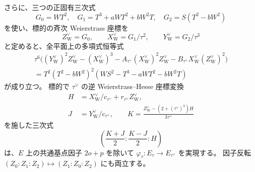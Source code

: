 \begin{proposition}
さらに、三つの正固有三次式
\begin{equation}\label{ifj:eq:cubic-sextet-isogeny-triple}
 G_0=WT^2,\quad
 G_1=T^3+aWT^2+bW^2T,\quad
 G_2=S(T^2-bW^2)
\end{equation}
を使い、標的の斉次 Weierstrass 座標を
\[
 Z^\vee_{\mathrm W}=G_0,\qquad
 X^\vee_{\mathrm W}=G_1/\tau^2,\qquad
 Y^\vee_{\mathrm W}=G_2/\tau^3
\]
と定めると、全平面上の多項式恒等式
\begin{equation}\label{ifj:eq:cubic-sextet-nine-identity}
 \begin{split}
 \tau^6\bigl(
 (Y^\vee_{\mathrm W})^2Z^\vee_{\mathrm W}
 -(X^\vee_{\mathrm W})^3
 -A_{\tau^\vee}(X^\vee_{\mathrm W})^2Z^\vee_{\mathrm W}
 -B_{\tau^\vee}X^\vee_{\mathrm W}(Z^\vee_{\mathrm W})^2
 \bigr)\\
 =T^2(T^2-bW^2)^2
       (WS^2-T^3-aWT^2-bW^2T)
 \end{split}
\end{equation}
が成り立つ。
標的で $\tau^\vee$ の逆 Weierstrass--Hesse 座標変換
\[
 \begin{split}
 H&=X^\vee_{\mathrm W}/c_{\tau^\vee}
                      +r_{\tau^\vee}Z^\vee_{\mathrm W},\\
 J&=Y^\vee_{\mathrm W}/c_{\tau^\vee},\qquad
 K=\frac{Z^\vee_{\mathrm W}
               -(2+(\tau^\vee)^3)H}{3\tau^\vee}
 \end{split}
\]
を施した三次式
\begin{equation}\label{ifj:eq:cubic-sextet-hesse-triple}
 \left(\frac{K+J}{2}:\frac{K-J}{2}:H\right)
\end{equation}
は、$E$ 上の共通基点因子 $2o+p$ を除いて
$\varphi_\tau:E_\tau\to E_{\tau^\vee}$ を実現する。
因子反転 $(Z_0:Z_1:Z_2)\mapsto(Z_1:Z_0:Z_2)$
にも両立する。
\end{proposition}

